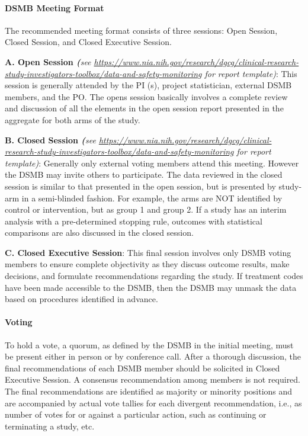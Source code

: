 \documentclass[]{book}
\begin{document}
\paragraph{DSMB Meeting Format}\label{dsmb-meeting-format}

The recommended meeting format consists of three sessions: Open Session,
Closed Session, and Closed Executive Session.

\textbf{A. Open Session \emph{(}}\emph{see
\url{https://www.nia.nih.gov/research/dgcg/clinical-research-study-investigators-toolbox/data-and-safety-monitoring}
for report template)}: This session is generally attended by the PI (s),
project statistician, external DSMB members, and the PO. The opens
session basically involves a complete review and discussion of all the
elements in the open session report presented in the aggregate for both
arms of the study.

\textbf{B. Closed Session \emph{(}}\emph{see
\url{https://www.nia.nih.gov/research/dgcg/clinical-research-study-investigators-toolbox/data-and-safety-monitoring}
for report template)}: Generally only external voting members attend
this meeting. However the DSMB may invite others to participate. The
data reviewed in the closed session is similar to that presented in the
open session, but is presented by study-arm in a semi-blinded fashion.
For example, the arms are NOT identified by control or intervention, but
as group 1 and group 2. If a study has an interim analysis with a
pre-determined stopping rule, outcomes with statistical comparisons are
also discussed in the closed session.

\textbf{C. Closed Executive Session}: This final session involves only
DSMB voting members to ensure complete objectivity as they discuss
outcome results, make decisions, and formulate recommendations regarding
the study. If treatment codes have been made accessible to the DSMB,
then the DSMB may unmask the data based on procedures identified in
advance.

\paragraph{Voting}\label{voting}

To hold a vote, a quorum, as defined by the DSMB in the initial meeting,
must be present either in person or by conference call. After a thorough
discussion, the final recommendations of each DSMB member should be
solicited in Closed Executive Session. A consensus recommendation among
members is not required. The final recommendations are identified as
majority or minority positions and are accompanied by actual vote
tallies for each divergent recommendation, i.e., as number of votes for
or against a particular action, such as continuing or terminating a
study, etc.
\end{document}
